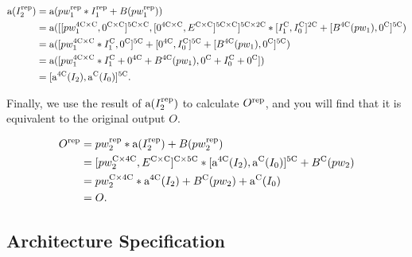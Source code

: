 \documentclass[preprint,12pt]{elsarticle}
\begin{document}
\begin{equation}
\begin{aligned}
{\rm a}(I_2^{\rm rep}) &= {\rm a}(pw_1^{\rm rep} * I_1^{\rm rep} + B(pw_1^{\rm rep}))\\
&= {\rm a}( [[pw_1^{4{\rm C} \times {\rm C}}, 0^{{\rm C} \times {\rm C}}]^{5{\rm C} \times {\rm C}}, [0^{4{\rm C} \times {\rm C}}, E^{{\rm C} \times {\rm C}}]^{5{\rm C} \times {\rm C}}]^{5{\rm C} \times 2{\rm C}} * [I_1^{\rm C}, I_0^{\rm C}]^{2{\rm C}} + [B^{4{\rm C}}(pw_1), 0^{\rm C}]^{5{\rm C}} )\\ 
&={\rm a}([pw_1^{4{\rm C} \times {\rm C}} * I_1^{\rm C} , 0^{{\rm C}}]^{5{\rm C}} + [0^{4{\rm C}}, I_0^{\rm C}]^{5{\rm C}} + [B^{4{\rm C}}(pw_1), 0^{{\rm C}}]^{5{\rm C}})\\
&={\rm a}([pw_1^{4{\rm C} \times {\rm C}} * I_1^{\rm C} + 0^{4{\rm C}} + B^{4{\rm C}}(pw_1), 0^{\rm C} + I_0^{\rm C} + 0^{\rm C}])\\
&=[{\rm a}^{4{\rm C}}(I_2), {\rm a}^{\rm C}(I_0)]^{5{\rm C}}.
\end{aligned}
\label{eq7}
\end{equation}

Finally, we use the result of ${\rm a}(I_2^{\rm rep})$ to calculate $O^{\rm rep}$, and you will find that it is equivalent to the original output $O$.

\begin{equation}
\begin{aligned}O^{\rm rep} &= pw_2^{\rm rep} * {\rm a}(I_2^{\rm rep}) + B(pw_2^{\rm rep})\\
&= [pw_2^{{\rm C} \times 4{\rm C}}, E^{{\rm C} \times {\rm C}}]^{{\rm C} \times 5{\rm C}} * [{\rm a}^{4{\rm C}}(I_2), {\rm a}^{\rm C}(I_0)]^{5{\rm C}} + B^{\rm C}(pw_2) \\ 
&= pw_2^{{\rm C} \times 4{\rm C}} * {\rm a}^{4{\rm C}}(I_2) + B^{\rm C}(pw_2) + {\rm a}^{\rm C}(I_0)\\
&= O.\end{aligned}
\label{eq8}
\end{equation}

\subsection{Architecture Specification}
\label{sec:3-3}
\end{document}
